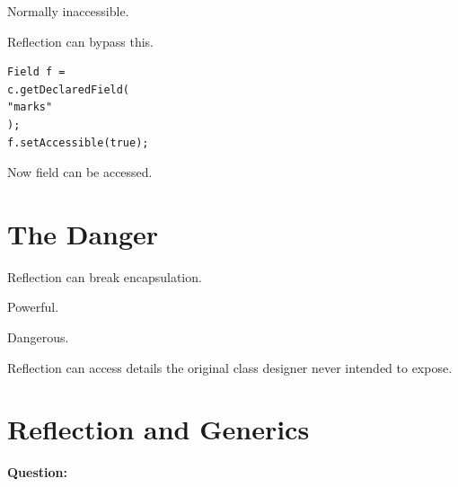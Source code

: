 \documentclass[11pt,a4paper]{book}
\begin{document}

Normally inaccessible.


Reflection can bypass this.


\begin{verbatim} 
Field f =
c.getDeclaredField(
"marks"
);
f.setAccessible(true);
\end{verbatim}


Now field can be accessed.


\section{The Danger}

Reflection can break
encapsulation.


Powerful.


Dangerous.


\begin{trap}

Reflection can access details
the original class designer
never intended to expose.

\end{trap}


\section{Reflection and Generics}

\textbf{Question:}

\end{document}
